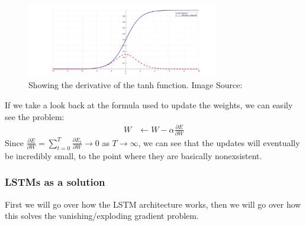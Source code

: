 \begin{figure}[!ht]
    \centering
        \includegraphics[width=0.75\textwidth]{latex/imgs/tanh_deriv.png}
    \caption{Showing the derivative of the tanh function. Image Source:\cite{grad}}
\end{figure}
If we take a look back at the formula used to update the weights, we can easily see the problem:
\begin{align}
    W &\leftarrow W - \alpha \frac{\partial E}{\partial W}
\end{align}
Since $\frac{\partial E}{\partial W} = \sum_{t=0}^{T} \frac{\partial E_t}{\partial W} \rightarrow 0$ as $T \rightarrow \infty$, we can see that the updates will eventually be incredibly small, to the point where they are basically nonexsistent.

\subsubsection{LSTMs as a solution}
First we will go over how the LSTM architecture works, then we will go over how this solves the vanishing/exploding gradient problem.\\

